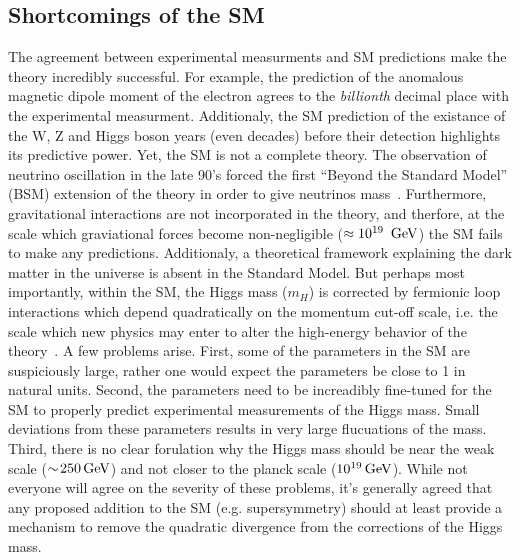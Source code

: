 \subsection{Shortcomings of the SM}
The agreement between experimental measurments and SM predictions make
the theory incredibly successful. For example, the prediction of the anomalous magnetic dipole 
moment of the electron agrees to the \textit{billionth} decimal place with the experimental 
measurment. Additionaly, the SM prediction of the existance of the W, Z and Higgs boson
years (even decades) before their detection highlights its predictive power. Yet, the SM is not 
a complete theory. The observation of neutrino oscillation in the late 90's forced the first 
``Beyond the Standard Model'' (BSM) extension of the theory in order to give neutrinos 
mass~\cite{zuber2003neutrino}. Furthermore, gravitational interactions are not incorporated in the theory,
and therfore, at the scale which graviational forces become non-negligible 
($\approx 10^{19}~\,\text{Ge\hspace{-.08em}V}$) the SM fails to make any predictions. Additionaly, a theoretical 
framework explaining the dark matter in the universe is absent in the Standard Model.
But perhaps most importantly, within the SM, the Higgs mass ($m_{H}$) is corrected by fermionic
loop interactions which depend quadratically on the momentum cut-off scale, i.e. the scale 
which new physics may enter to alter the high-energy behavior of the theory~\cite{Martin:1997ns}.
A few problems arise. First, some of the parameters in the SM are suspiciously large, rather one 
would expect the parameters be close to 1 in natural units. Second, the parameters
need to be increadibly fine-tuned for the SM to properly predict experimental measurements of the
Higgs mass. Small deviations from these parameters results in very large flucuations of the mass. 
Third, there is no clear forulation why the Higgs mass should be near the weak scale ($\sim\!250\,\text{Ge\hspace{-.08em}V}$) 
and not closer to the planck scale ($10^{19}\,\text{Ge\hspace{-.08em}V}$). While not everyone will agree on the 
severity of these problems, it's generally agreed that any proposed addition to the SM 
(e.g. supersymmetry) should at least provide a mechanism to remove the quadratic divergence from the corrections of 
the Higgs mass.

